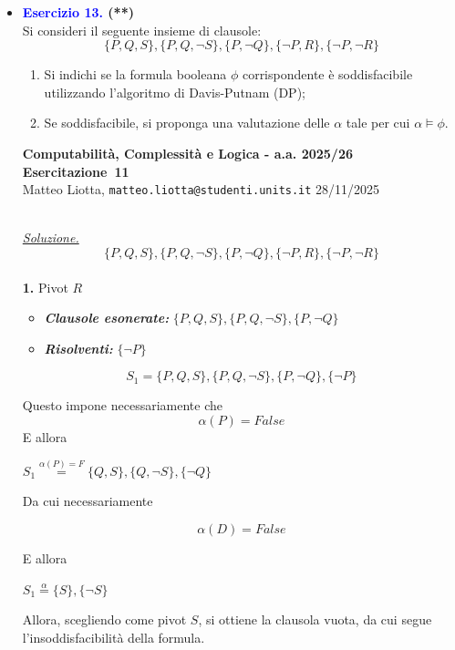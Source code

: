 \documentclass[a4paper,10pt]{article}
\makeatletter
\newcommand{\EsercitazioneNum}{11}
\newcommand{\Data}{28/11/2025}
\newcommand{\DocType}{Esercitazione} %
\newcommand{\FullTitle}{\DocType\ \EsercitazioneNum}
\newcommand{\Header}{
\noindent
  \small \textbf{Computabilità, Complessità e Logica - a.a. 2025/26} \hfill \textbf{\FullTitle} \\[0.2cm]
  \scriptsize Matteo Liotta, \texttt{matteo.liotta@studenti.units.it} \hfill \Data \\[0.2cm]
  \noindent\makebox[\linewidth]{\rule{\linewidth}{0.4pt}} \\[0.3cm]}
\newcommand{\NewPageHeader}{
  \vfill
  \noindent\makebox[\linewidth]{\rule{\linewidth}{0.4pt}}
  \newpage
  {\Header}
}
\makeatother
\begin{document}
{\begin{itemize}[label=, leftmargin=0pt]
\begin{osservazioni}
    
    \end{osservazioni}

    \item \textbf{\textcolor{blue}{Esercizio 13.} (**)}\\ 	
    Si consideri il seguente insieme di clausole:
    $$\{P, Q, S\}, \{P, Q, \lnot S\}, \{P, \lnot Q\}, \{\lnot P, R\}, \{\lnot P, \lnot R\}$$
    \begin{enumerate}
        \item Si indichi se la formula booleana $\phi$ corrispondente è soddisfacibile utilizzando l'algoritmo di Davis-Putnam (DP);
        \item Se soddisfacibile, si proponga una valutazione delle  $\alpha$ tale per cui $\alpha\models\phi$.\\[0.2cm]
    \end{enumerate}

    \NewPageHeader

    \begin{osservazioni}
    \underline{\textit{Soluzione.}}\\
    $$\{P, Q, S\}, \{P, Q, \lnot S\}, \{P, \lnot Q\}, \{\lnot P, R\}, \{\lnot P, \lnot R\}$$\\
    
    \textbf{1.} Pivot $R$
    \begin{itemize}
        \item \textbf{\textit{Clausole esonerate:}} $\{P, Q, S\}, \{P, Q, \lnot S\}, \{P, \lnot Q\}$
        \item \textbf{\textit{Risolventi:}} $\{\lnot P\}$
    \end{itemize}
    $$S_1 = \{P, Q, S\}, \{P, Q, \lnot S\}, \{P, \lnot Q\},\{\lnot P\}$$

    Questo impone necessariamente che 
    $$\alpha(P)=False$$
    E allora 

    $S_1\overset{\alpha(P)=F}{=}\{Q, S\}, \{Q, \lnot S\}, \{\lnot Q\}$

    Da cui necessariamente

    $$\alpha(D)=False$$

    E allora 

    $S_1\overset{\alpha}{=}\{S\}, \{\lnot S\}$

    Allora, scegliendo come pivot $S$, si ottiene la clausola vuota, da cui segue l'insoddisfacibilità della formula.
    
    \end{osservazioni}


\end{itemize}}
\end{document}
